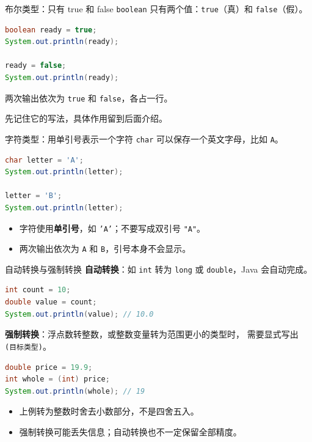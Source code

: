 \documentclass[aspectratio=169]{beamer}
\begin{document}
\begin{frame}[fragile]{布尔类型：只有 true 和 false}
  \texttt{boolean} 只有两个值：\texttt{true}（真）和 \texttt{false}（假）。
  \par\medskip
  \begin{lstlisting}[language=Java]
boolean ready = true;
System.out.println(ready);

ready = false;
System.out.println(ready);
  \end{lstlisting}
  两次输出依次为 \texttt{true} 和 \texttt{false}，各占一行。
  \par\medskip
  先记住它的写法，具体作用留到后面介绍。
\end{frame}

\begin{frame}[fragile]{字符类型：用单引号表示一个字符}
  \texttt{char} 可以保存一个英文字母，比如 \texttt{A}。
  \par\medskip
  \begin{lstlisting}[language=Java]
char letter = 'A';
System.out.println(letter);

letter = 'B';
System.out.println(letter);
  \end{lstlisting}
  \begin{itemize}
    \item 字符使用\textbf{单引号}，如 \texttt{'A'}；不要写成双引号 \texttt{"A"}。
    \item 两次输出依次为 \texttt{A} 和 \texttt{B}，引号本身不会显示。
  \end{itemize}
\end{frame}

\begin{frame}[fragile]{自动转换与强制转换}
  \textbf{自动转换}：如 \texttt{int} 转为 \texttt{long} 或 \texttt{double}，Java 会自动完成。
  \begin{lstlisting}[language=Java]
int count = 10;
double value = count;
System.out.println(value); // 10.0
  \end{lstlisting}
  \textbf{强制转换}：浮点数转整数，或整数变量转为范围更小的类型时，
  需要显式写出 \texttt{(目标类型)}。
  \begin{lstlisting}[language=Java]
double price = 19.9;
int whole = (int) price;
System.out.println(whole); // 19
  \end{lstlisting}
  \begin{itemize}
    \item 上例转为整数时舍去小数部分，不是四舍五入。
    \item 强制转换可能丢失信息；自动转换也不一定保留全部精度。
  \end{itemize}
\end{frame}
\end{document}
